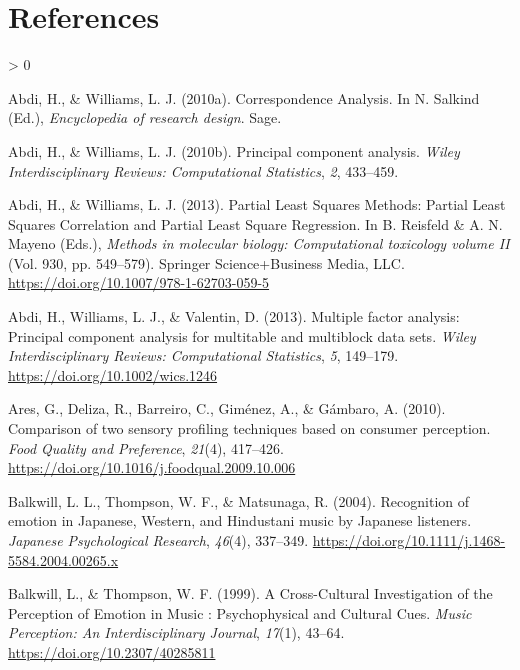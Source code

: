 \documentclass[
  english,
  man,floatsintext]{apa6}
\newlength{\cslhangindent}
\newenvironment{CSLReferences}[2] %
 {%
  \setlength{\parindent}{0pt}
  \ifodd #1 \everypar{\setlength{\hangindent}{\cslhangindent}}\ignorespaces\fi
  \ifnum #2 > 0
  \setlength{\parskip}{#2\baselineskip}
  \fi
 }%
 {}
\begin{document}
\newpage

\hypertarget{references}{%
\section{References}\label{references}}

\begingroup
\setlength{\parindent}{-0.5in}
\setlength{\leftskip}{0.5in}

\hypertarget{refs}{}
\begin{CSLReferences}{1}{0}
\leavevmode\hypertarget{ref-Abdi2010d}{}%
Abdi, H., \& Williams, L. J. (2010a). {Correspondence Analysis}. In N. Salkind (Ed.), \emph{Encyclopedia of research design}. Sage.

\leavevmode\hypertarget{ref-Abdi2010f}{}%
Abdi, H., \& Williams, L. J. (2010b). {Principal component analysis}. \emph{Wiley Interdisciplinary Reviews: Computational Statistics}, \emph{2}, 433--459.

\leavevmode\hypertarget{ref-Abdi2013a}{}%
Abdi, H., \& Williams, L. J. (2013). {Partial Least Squares Methods: Partial Least Squares Correlation and Partial Least Square Regression}. In B. Reisfeld \& A. N. Mayeno (Eds.), \emph{Methods in molecular biology: Computational toxicology volume II} (Vol. 930, pp. 549--579). Springer Science+Business Media, LLC. \url{https://doi.org/10.1007/978-1-62703-059-5}

\leavevmode\hypertarget{ref-Abdi2013}{}%
Abdi, H., Williams, L. J., \& Valentin, D. (2013). {Multiple factor analysis: Principal component analysis for multitable and multiblock data sets}. \emph{Wiley Interdisciplinary Reviews: Computational Statistics}, \emph{5}, 149--179. \url{https://doi.org/10.1002/wics.1246}

\leavevmode\hypertarget{ref-Ares2010}{}%
Ares, G., Deliza, R., Barreiro, C., Giménez, A., \& Gámbaro, A. (2010). {Comparison of two sensory profiling techniques based on consumer perception}. \emph{Food Quality and Preference}, \emph{21}(4), 417--426. \url{https://doi.org/10.1016/j.foodqual.2009.10.006}

\leavevmode\hypertarget{ref-Balkwill2004}{}%
Balkwill, L. L., Thompson, W. F., \& Matsunaga, R. (2004). {Recognition of emotion in Japanese, Western, and Hindustani music by Japanese listeners}. \emph{Japanese Psychological Research}, \emph{46}(4), 337--349. \url{https://doi.org/10.1111/j.1468-5584.2004.00265.x}

\leavevmode\hypertarget{ref-Balkwill1999}{}%
Balkwill, L., \& Thompson, W. F. (1999). {A Cross-Cultural Investigation of the Perception of Emotion in Music : Psychophysical and Cultural Cues}. \emph{Music Perception: An Interdisciplinary Journal}, \emph{17}(1), 43--64. \url{https://doi.org/10.2307/40285811}


\end{CSLReferences}
\end{document}
